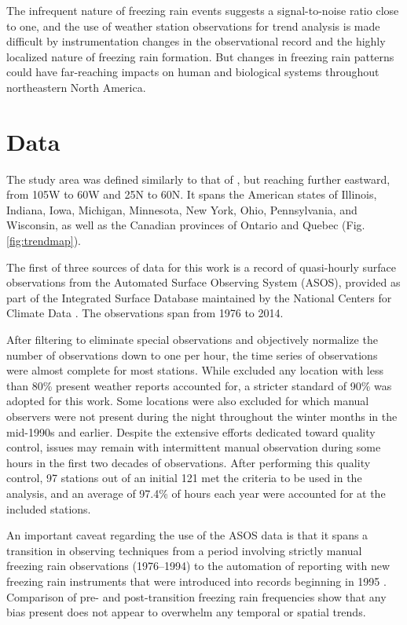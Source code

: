\documentclass[twocol]{ametsoc}
\begin{document}
The infrequent nature of freezing rain events suggests a signal-to-noise ratio close to one, and the use of weather station observations for trend analysis is made difficult by instrumentation changes in the observational record and the highly localized nature of freezing rain formation. But changes in freezing rain patterns could have far-reaching impacts on human and biological systems throughout northeastern North America.

\section{Data}
The study area was defined similarly to that of \citet{cortinas2000climatology}, but reaching further eastward, from 105\degree W to 60\degree W and 25\degree N to 60\degree N. It spans the American states of Illinois, Indiana, Iowa, Michigan, Minnesota, New York, Ohio, Pennsylvania, and Wisconsin, as well as the Canadian provinces of Ontario and Quebec (Fig. \ref{fig:trendmap}).

The first of three sources of data for this work is a record of quasi-hourly surface observations from the Automated Surface Observing System (ASOS), provided as part of the Integrated Surface Database maintained by the National Centers for Climate Data \citep{smith2011integrated}. The observations span from 1976 to 2014.

After filtering to eliminate special observations and objectively normalize the number of observations down to one per hour, the time series of observations were almost complete for most stations. While \citet{cortinas2000climatology} excluded any location with less than 80\% present weather reports accounted for, a stricter standard of 90\% was adopted for this work. Some locations were also excluded for which manual observers were not present during the night throughout the winter months in the mid-1990s and earlier. Despite the extensive efforts dedicated toward quality control, issues may remain with intermittent manual observation during some hours in the first two decades of observations. After performing this quality control, 97 stations out of an initial 121 met the criteria to be used in the analysis, and an average of 97.4\% of hours each year were accounted for at the included stations.

An important caveat regarding the use of the ASOS data is that it spans a transition in observing techniques from a period involving strictly manual freezing rain observations (1976--1994) to the automation of reporting with new freezing rain instruments that were introduced into records beginning in 1995 \citep{ramsay1995status,asos1998}. Comparison of pre- and post-transition freezing rain frequencies show that any bias present does not appear to overwhelm any temporal or spatial trends.
\end{document}
